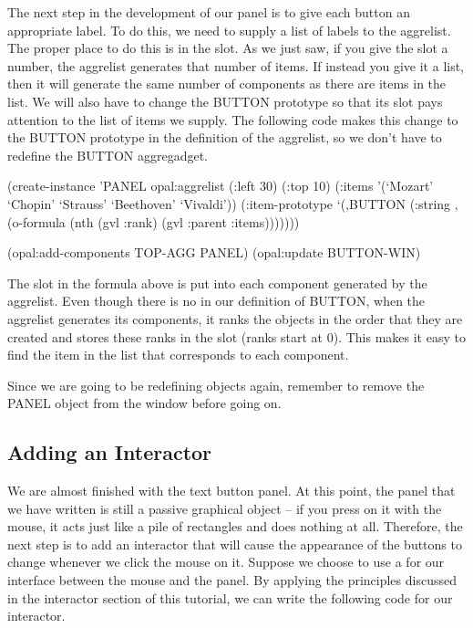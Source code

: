 The next step in the development of our panel is to give each button
an appropriate label.  To do this, we need to supply a list of
labels to the aggrelist.  The proper place to do this is in the
 slot.  As we just saw, if you give the  slot a
number, the aggrelist generates that number of items.  If instead you
give it a list, then it will generate the same number of components as
there are items in the list.  We will also have to change the BUTTON
prototype so that its  slot pays attention to the list of
items we supply.  The following code makes this change to the BUTTON
prototype in the definition of the aggrelist, so we don't have to
redefine the BUTTON aggregadget.

\begin{programexample}
(create-instance 'PANEL opal:aggrelist
   (:left 30) (:top 10)
   (:items '(`Mozart' `Chopin' `Strauss' `Beethoven' `Vivaldi'))
   (:item-prototype
    `(,BUTTON
      (:string ,(o-formula (nth (gvl :rank) (gvl :parent :items)))))))

(opal:add-components TOP-AGG PANEL)
(opal:update BUTTON-WIN)
\end{programexample}

The  slot in the  formula above is put into each
component generated by the aggrelist.  Even though there is no
 in our definition of BUTTON, when the aggrelist generates
its components, it ranks the objects in the order that they are
created and stores these ranks in the  slot (ranks start at 0).
This makes it easy to find the item in the  list that
corresponds to each component.

Since we are going to be redefining objects again, remember to remove
the PANEL object from the window before going on.


\subsection{Adding an Interactor}

We are almost finished with the text button panel.
At this point, the panel that we have written is still a passive
graphical object -- if you press on it with the mouse, it acts just
like a pile of rectangles and does nothing at all.  Therefore, the
next step is to add an interactor that will cause the appearance of
the buttons to change whenever we click the mouse on it.  Suppose we
choose to use a  for our interface between the
mouse and the panel.  By applying the principles discussed in
the interactor section of this tutorial, we can write the following
code for our interactor.

